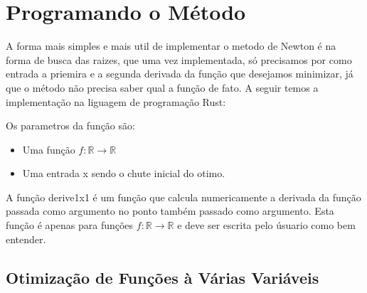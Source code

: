 \section{{Programando o Método}}

\hspace{0.8cm}

A forma mais simples e mais util de implementar o metodo de Newton é na forma
de busca das raizes, que uma vez  implementada, só precisamos por como entrada
a priemira e a segunda derivada da função que desejamos minimizar, já que o
método não precisa saber qual a função de fato. A seguir temos a implementação
na liguagem de programação Rust:



Os parametros da função são:

    \begin{itemize}
            \item Uma função \(f : \mathbb{R} \rightarrow \mathbb{R}\)
            \item Uma entrada x sendo o chute inicial do otimo.
    \end{itemize}


A função derive1x1 é um função que calcula numericamente a derivada da função
passada como argumento no ponto também passado como argumento. Esta função é
apenas para funções \(f : \mathbb{R} \rightarrow \mathbb{R}\) e deve ser escrita
pelo úsuario como bem entender.



\textcolor[rgb]{1,0,0}{\section{{Otimização de Funções à Várias Variáveis}}}

\hspace{0.8cm}





%
